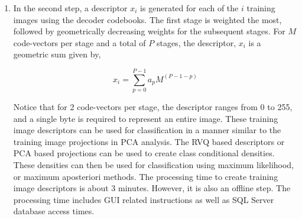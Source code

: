 \documentclass[12pt,letterpaper,doublespaced,ETD,proposal]{gt-ece-thesis}
\begin{document}
\begin{Body}
\begin{enumerate}
\item In the second step, a descriptor $x_i$ is generated for each of the $i$ training images using the decoder codebooks.  The first stage is weighted the most, followed by geometrically decreasing weights for the subsequent stages.  For $M$ code-vectors per stage and a total of $P$ stages, the descriptor, $x_i$ is a geometric sum given by,

\begin{equation}
x_i=\sum_{p=0}^{P-1}a_pM^{(P-1-p)}
\end{equation}

Notice that for 2 code-vectors per stage, the descriptor ranges from 0 to 255, and a single byte is required to represent an entire image.  These training image descriptors can be used for classification in a manner similar to the training image projections in PCA analysis.  The RVQ based descriptors or PCA based projections can be used to create class conditional densities.  These densities can then be used for classification using maximum likelihood, or maximum aposteriori methods.  The processing time to create training image descriptors is about 3 minutes.  However, it is also an offline step.  The processing time includes GUI related instructions as well as SQL Server database access times.


\end{enumerate}
\end{Body}
\end{document}
